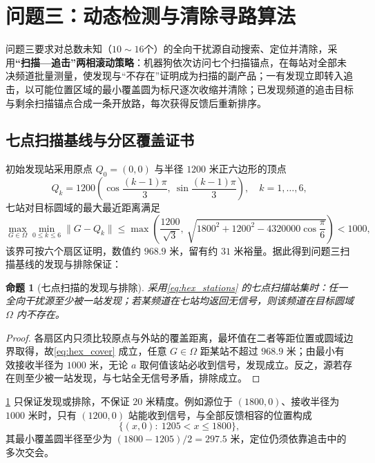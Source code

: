 \documentclass[withoutpreface]{cumcmthesis}
\newtheorem{proposition}{命题}
\begin{document}
\section{问题三：动态检测与清除寻路算法}\label{sec:q3}

问题三要求对总数未知（$10\sim16$个）的全向干扰源自动搜索、定位并清除，采用\textbf{“扫描—追击”两相滚动策略}：机器狗依次访问七个扫描锚点，在每站对全部未决频道批量测量，使发现与“不存在”证明成为扫描的副产品；一有发现立即转入追击，以可能位置区域的最小覆盖圆为标尺逐次收缩并清除；已发现频道的追击目标与剩余扫描锚点合成一条开放路，每次获得反馈后重新排序。

\subsection{七点扫描基线与分区覆盖证书}

初始发现站采用原点 $Q_0=(0,0)$ 与半径 $1200$ 米正六边形的顶点
\begin{equation}\label{eq:hex_stations}
Q_k=1200\left(\cos\frac{(k-1)\pi}{3},\ \sin\frac{(k-1)\pi}{3}\right),\quad k=1,\ldots,6,
\end{equation}
七站对目标圆域的最大最近距离满足
\begin{equation}\label{eq:hex_cover}
\max_{G\in\Omega}\min_{0\le k\le6}\|G-Q_k\|\le\max\left(\frac{1200}{\sqrt3},\ \sqrt{1800^2+1200^2-4320000\cos\frac{\pi}{6}}\right)<1000,
\end{equation}
该界可按六个扇区证明，数值约 $968.9$ 米，留有约 $31$ 米裕量。据此得到问题三扫描基线的发现与排除保证：

\begin{proposition}[七点扫描的发现与排除]\label{prop:hex-discover}
采用\cref{eq:hex_stations} 的七点扫描站集时：任一全向干扰源至少被一站发现；若某频道在七站均返回无信号，则该频道在目标圆域 $\Omega$ 内不存在。
\end{proposition}
\begin{proof}
各扇区内只须比较原点与外站的覆盖距离，最坏值在二者等距位置或圆域边界取得，故\cref{eq:hex_cover} 成立，任意 $G\in\Omega$ 距某站不超过 $968.9$ 米；由最小有效接收半径为 $1000$ 米，无论 $a$ 取何值该站必收到信号，发现成立。反之，源若存在则至少被一站发现，与七站全无信号矛盾，排除成立。
\end{proof}

\cref{prop:hex-discover} 只保证发现或排除，不保证 $20$ 米精度。例如源位于 $(1800,0)$、接收半径为 $1000$ 米时，只有 $(1200,0)$ 站能收到信号，与全部反馈相容的位置构成
\[
\{(x,0):\ 1205<x\le1800\},
\]
其最小覆盖圆半径至少为 $(1800-1205)/2=297.5$ 米，定位仍须依靠追击中的多次交会。
\end{document}
